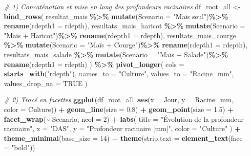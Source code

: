 \documentclass[
]{article}
\newenvironment{Shaded}{\begin{snugshade}}{\end{snugshade}}
\newcommand{\AttributeTok}[1]{\textcolor[rgb]{0.13,0.29,0.53}{#1}}
\newcommand{\CommentTok}[1]{\textcolor[rgb]{0.56,0.35,0.01}{\textit{#1}}}
\newcommand{\ConstantTok}[1]{\textcolor[rgb]{0.56,0.35,0.01}{#1}}
\newcommand{\DecValTok}[1]{\textcolor[rgb]{0.00,0.00,0.81}{#1}}
\newcommand{\FloatTok}[1]{\textcolor[rgb]{0.00,0.00,0.81}{#1}}
\newcommand{\FunctionTok}[1]{\textcolor[rgb]{0.13,0.29,0.53}{\textbf{#1}}}
\newcommand{\NormalTok}[1]{#1}
\newcommand{\OtherTok}[1]{\textcolor[rgb]{0.56,0.35,0.01}{#1}}
\newcommand{\SpecialCharTok}[1]{\textcolor[rgb]{0.81,0.36,0.00}{\textbf{#1}}}
\newcommand{\StringTok}[1]{\textcolor[rgb]{0.31,0.60,0.02}{#1}}
\begin{document}
\begin{Shaded}
\begin{Highlighting}[]
\CommentTok{\# 1) Concaténation et mise en long des profondeurs racinaires}
\NormalTok{df\_root\_all }\OtherTok{\textless{}{-}} \FunctionTok{bind\_rows}\NormalTok{(}
\NormalTok{  resultat\_mais          }\SpecialCharTok{\%\textgreater{}\%} \FunctionTok{mutate}\NormalTok{(}\AttributeTok{Scenario =} \StringTok{"Maïs seul"}\NormalTok{)}\SpecialCharTok{\%\textgreater{}\%} \FunctionTok{rename}\NormalTok{(}\AttributeTok{rdepth1 =}\NormalTok{ rdepth),}
\NormalTok{  resultats\_mais\_haricot }\SpecialCharTok{\%\textgreater{}\%} \FunctionTok{mutate}\NormalTok{(}\AttributeTok{Scenario =} \StringTok{"Maïs + Haricot"}\NormalTok{)}\SpecialCharTok{\%\textgreater{}\%} \FunctionTok{rename}\NormalTok{(}\AttributeTok{rdepth1 =}\NormalTok{ rdepth),}
\NormalTok{  resultats\_mais\_courge  }\SpecialCharTok{\%\textgreater{}\%} \FunctionTok{mutate}\NormalTok{(}\AttributeTok{Scenario =} \StringTok{"Maïs + Courge"}\NormalTok{)}\SpecialCharTok{\%\textgreater{}\%} \FunctionTok{rename}\NormalTok{(}\AttributeTok{rdepth1 =}\NormalTok{ rdepth),}
\NormalTok{  resultats\_mais\_salade  }\SpecialCharTok{\%\textgreater{}\%} \FunctionTok{mutate}\NormalTok{(}\AttributeTok{Scenario =} \StringTok{"Maïs + Salade"}\NormalTok{)}\SpecialCharTok{\%\textgreater{}\%} \FunctionTok{rename}\NormalTok{(}\AttributeTok{rdepth1 =}\NormalTok{ rdepth)}
\NormalTok{) }\SpecialCharTok{\%\textgreater{}\%}
  \FunctionTok{pivot\_longer}\NormalTok{(}
    \AttributeTok{cols            =} \FunctionTok{starts\_with}\NormalTok{(}\StringTok{"rdepth"}\NormalTok{),}
    \AttributeTok{names\_to        =} \StringTok{"Culture"}\NormalTok{,}
    \AttributeTok{values\_to       =} \StringTok{"Racine\_mm"}\NormalTok{,}
    \AttributeTok{values\_drop\_na  =} \ConstantTok{TRUE}
\NormalTok{  )}

\CommentTok{\# 2) Tracé en facettes}
\FunctionTok{ggplot}\NormalTok{(df\_root\_all, }\FunctionTok{aes}\NormalTok{(}\AttributeTok{x =}\NormalTok{ Jour, }\AttributeTok{y =}\NormalTok{ Racine\_mm, }\AttributeTok{color =}\NormalTok{ Culture)) }\SpecialCharTok{+}
  \FunctionTok{geom\_line}\NormalTok{(}\AttributeTok{size =} \FloatTok{0.8}\NormalTok{) }\SpecialCharTok{+}
  \FunctionTok{geom\_point}\NormalTok{(}\AttributeTok{size =} \FloatTok{1.5}\NormalTok{) }\SpecialCharTok{+}
  \FunctionTok{facet\_wrap}\NormalTok{(}\SpecialCharTok{\textasciitilde{}}\NormalTok{ Scenario, }\AttributeTok{ncol =} \DecValTok{2}\NormalTok{) }\SpecialCharTok{+}
  \FunctionTok{labs}\NormalTok{(}
    \AttributeTok{title =} \StringTok{"Évolution de la profondeur racinaire"}\NormalTok{,}
    \AttributeTok{x     =} \StringTok{"DAS"}\NormalTok{,}
    \AttributeTok{y     =} \StringTok{"Profondeur racinaire [mm]"}\NormalTok{,}
    \AttributeTok{color =} \StringTok{"Culture"}
\NormalTok{  ) }\SpecialCharTok{+}
  \FunctionTok{theme\_minimal}\NormalTok{(}\AttributeTok{base\_size =} \DecValTok{14}\NormalTok{) }\SpecialCharTok{+}
  \FunctionTok{theme}\NormalTok{(}\AttributeTok{strip.text =} \FunctionTok{element\_text}\NormalTok{(}\AttributeTok{face =} \StringTok{"bold"}\NormalTok{))}
\end{Highlighting}
\end{Shaded}
\end{document}
